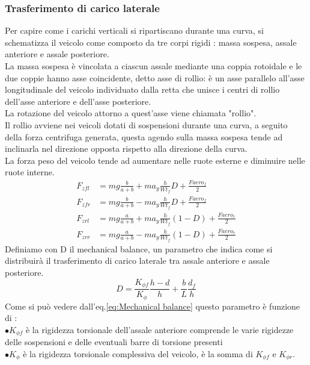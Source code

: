 \subsubsection{Trasferimento di carico laterale} \label{Trasferimento di carico laterale}
Per capire come i carichi verticali si ripartiscano durante una curva, si schematizza il veicolo come composto da tre corpi rigidi : massa sospesa, assale anteriore e assale posteriore.\\
La massa sospesa è vincolata a ciascun assale mediante una coppia rotoidale e le due coppie hanno asse coincidente, detto asse di rollio: 
è un asse parallelo all'asse longitudinale del veicolo individuato dalla retta che unisce i centri di rollio dell'asse anteriore e dell'asse posteriore.\\
La rotazione del veicolo attorno a quest'asse viene chiamata "rollio".\\
Il rollio avviene nei veicoli dotati di sospensioni durante una curva, a seguito della forza centrifuga generata, questa agendo sulla massa sospesa tende ad inclinarla nel direzione opposta rispetto alla direzione della curva.\\
La forza peso del veicolo tende ad aumentare nelle ruote esterne e diminuire nelle ruote interne.\\
\begin{align}
F_{zfl} & = mg \frac{b}{a+b} + m a_y \frac{h}{Wt_f} D + \frac{Faero_f}{2}\\
F_{zfr} & = mg \frac{b}{a+b} - m a_y \frac{h}{Wt_f} D + \frac{Faero_f}{2}\\
F_{zrl} & = mg \frac{a}{a+b} + m a_y \frac{h}{Wt_f} (1-D) + \frac{Faero_r}{2}\\
F_{zrr} & = mg \frac{a}{a+b} - m a_y \frac{h}{Wt_f} (1-D) + \frac{Faero_r}{2}
\end{align}
Definiamo con D il mechanical balance, un parametro che indica come si distribuirà il trasferimento di carico laterale tra assale anteriore e assale posteriore.
\begin{equation}
    D = \frac{K_{\phi f}}{K_\phi}\frac{h-d}{h} + \frac{b}{L} \frac{d_f}{h} \label{eq:Mechanical balance}
\end{equation}
Come si può vedere dall'eq.\ref{eq:Mechanical balance} questo parametro è funzione di :\\
$\bullet K_{\phi f}$ è la rigidezza torsionale dell'assale anteriore comprende le varie rigidezze delle sospensioni e delle eventuali barre di torsione presenti\\
$\bullet K_{\phi}$ è la rigidezza torsionale complessiva del veicolo, è la somma di $K_{\phi f}$ e $K_{\phi r}$.\\

